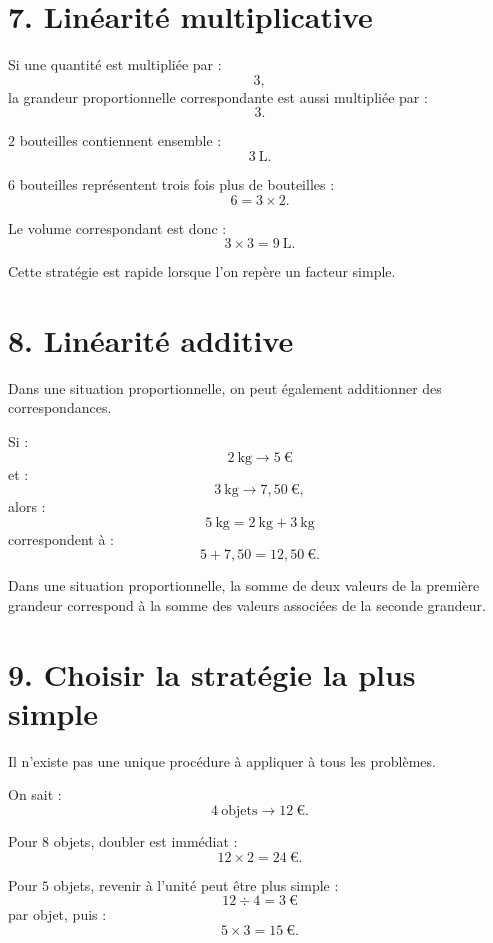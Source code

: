 \section{7. Linéarité multiplicative}

Si une quantité est multipliée par :
\[
3,
\]
la grandeur proportionnelle correspondante est aussi multipliée par :
\[
3.
\]

\begin{exemple}
$2$ bouteilles contiennent ensemble :
\[
3\ \text{L}.
\]

$6$ bouteilles représentent trois fois plus de bouteilles :
\[
6=3\times2.
\]

Le volume correspondant est donc :
\[
3\times3=9\ \text{L}.
\]
\end{exemple}

Cette stratégie est rapide lorsque l'on repère un facteur simple.

\section{8. Linéarité additive}

Dans une situation proportionnelle, on peut également additionner des correspondances.

Si :
\[
2\ \text{kg}\longrightarrow5\ \text{€}
\]
et :
\[
3\ \text{kg}\longrightarrow7{,}50\ \text{€},
\]
alors :
\[
5\ \text{kg}=2\ \text{kg}+3\ \text{kg}
\]
correspondent à :
\[
5+7{,}50=12{,}50\ \text{€}.
\]

\begin{propriete}
Dans une situation proportionnelle, la somme de deux valeurs de la première grandeur correspond à la somme des valeurs associées de la seconde grandeur.
\end{propriete}

\section{9. Choisir la stratégie la plus simple}

Il n'existe pas une unique procédure à appliquer à tous les problèmes.


\begin{exemple}
On sait :
\[
4\ \text{objets}\longrightarrow12\ \text{€}.
\]

Pour $8$ objets, doubler est immédiat :
\[
12\times2=24\ \text{€}.
\]

Pour $5$ objets, revenir à l'unité peut être plus simple :
\[
12\div4=3\ \text{€}
\]
par objet, puis :
\[
5\times3=15\ \text{€}.
\]
\end{exemple}

